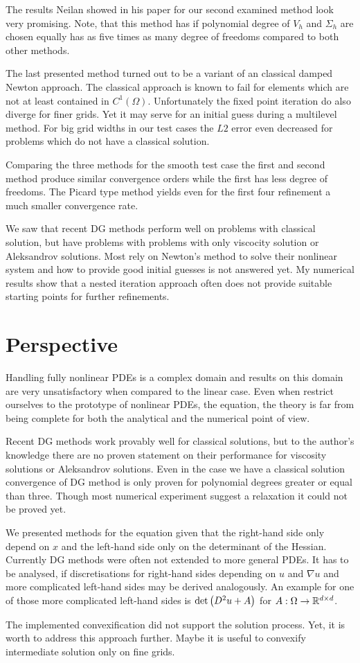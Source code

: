 The results Neilan showed in his paper for our second examined method look very promising.
Note, that this method has if polynomial degree of $V_h$ and $\Sigma_h$ are chosen equally has as five times as many degree of freedoms compared to both other methods.

The last presented method turned out to be a variant of an classical damped Newton approach. 
The classical approach is known to fail for elements which are not at least contained in $C^1(\Omega)$. Unfortunately the fixed point iteration do also diverge for finer grids. Yet it may serve for an initial guess during a multilevel method. For big grid widths in our test cases the $L2$ error even decreased for problems which do not have a classical solution.

Comparing the three methods for the smooth test case the first and second method produce similar convergence orders while the first has less degree of freedoms. The Picard type method yields even for the first four refinement a much smaller convergence rate.

We saw that recent DG methods perform well on problems with classical solution, but have problems with problems with only viscocity solution or Aleksandrov solutions. Most rely on Newton's method to solve their nonlinear system and how to provide good initial guesses is not answered yet.
My numerical results show that a nested iteration approach often does not provide suitable starting points for further refinements.

\section{Perspective}
Handling fully nonlinear PDEs is a complex domain and results on this domain are very unsatisfactory when compared to the linear case. Even when restrict ourselves to the prototype of nonlinear PDEs, the \MA equation, the theory is far from being complete for both the analytical and the numerical point of view.

Recent DG methods work provably well for classical solutions, but to the author's knowledge there are no proven statement on their performance for viscosity solutions or Aleksandrov solutions. Even in the case we have a classical solution convergence of DG method is only proven for polynomial degrees greater or equal than three. Though most numerical experiment suggest a relaxation it could not be proved yet.

We presented methods for the \MA equation given that the right-hand side only depend on $x$ and the left-hand side only on the determinant of the Hessian. Currently DG methods were often not extended to more general PDEs. It has to be analysed, if  discretisations for right-hand sides depending on $u$ and $\nabla u$ and more complicated left-hand sides may be derived analogously. An example for one of those more complicated left-hand sides is $\det{\left(D^2 u +A\right)}$ for $A:\Omega \rightarrow \mathbb{R}^{d \times d}$.
 
The implemented convexification did not support the solution process. Yet, it is worth to address this approach further. Maybe it is useful to convexify intermediate solution only on fine grids.


